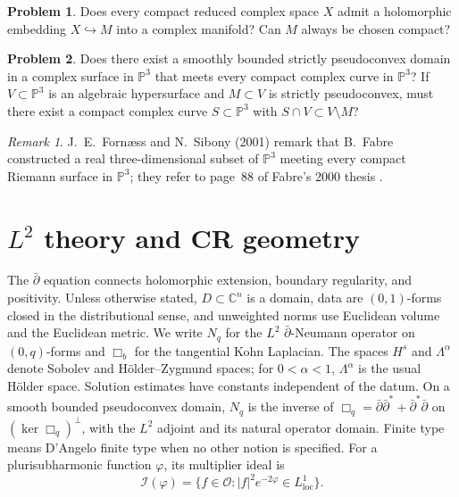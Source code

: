 \documentclass[11pt,reqno]{amsart}
\theoremstyle{definition}
\newtheorem{problem}{Problem}[section]
\theoremstyle{remark}
\newtheorem*{remark}{Remark}
\begin{document}
\begin{problem}\label{b95-11-1-1}
Does every compact reduced complex space $X$ admit a holomorphic embedding $X\hookrightarrow M$ into a complex manifold? Can $M$ always be chosen compact?
\end{problem}

\begin{problem}\label{FS-3.11}
Does there exist a smoothly bounded strictly pseudoconvex domain in a complex surface in $\mathbb P^3$ that meets every compact complex curve in $\mathbb P^3$? If $V\subset\mathbb P^3$ is an algebraic hypersurface and $M\subset V$ is strictly pseudoconvex, must there exist a compact complex curve $S\subset\mathbb P^3$ with $S\cap V\subset V\setminus M$?
\end{problem}
\begin{remark}
J.~E.~Forn\ae ss and N.~Sibony (2001) remark that B.~Fabre constructed a real three-dimensional subset of $\mathbb P^3$ meeting every compact Riemann surface in $\mathbb P^3$; they refer to page~88 of Fabre's 2000 thesis \cite[Question~3.11]{FS2001}.
\end{remark}

\section{\texorpdfstring{$L^2$ theory and CR geometry}{L2 theory and CR geometry}}

The $\bar\partial$ equation connects holomorphic extension, boundary regularity, and positivity. Unless otherwise stated, $D\subset\mathbb C^n$ is a domain, data are $(0,1)$-forms closed in the distributional sense, and unweighted norms use Euclidean volume and the Euclidean metric. We write $N_q$ for the $L^2$ $\bar\partial$-Neumann operator on $(0,q)$-forms and $\Box_b$ for the tangential Kohn Laplacian. The spaces $H^s$ and $\Lambda^\alpha$ denote Sobolev and H\"older--Zygmund spaces; for $0<\alpha<1$, $\Lambda^\alpha$ is the usual H\"older space. Solution estimates have constants independent of the datum. On a smooth bounded pseudoconvex domain, $N_q$ is the inverse of $\Box_q=\bar\partial\bar\partial^*+\bar\partial^*\bar\partial$ on $(\ker\Box_q)^\perp$, with the $L^2$ adjoint and its natural operator domain. Finite type means D'Angelo finite type when no other notion is specified. For a plurisubharmonic function $\varphi$, its multiplier ideal is
\[
 \mathcal I(\varphi)=\{f\in\mathcal O:|f|^2e^{-2\varphi}\in L^1_{\mathrm{loc}}\}.
\]
\end{document}

